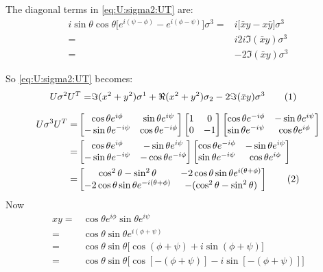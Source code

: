\documentclass[]{article}
\newcommand\numberthis{\addtocounter{equation}{1}\tag{\theequation}}
\begin{document}
The diagonal terms in \eqref{eq:U:sigma2:UT} are:
\begin{align*}
	i \sin{\theta}\cos{\theta}\big[e^{i(\psi-\phi)}-e^{i(\phi-\psi)}\big] \sigma^3 =& i \big[\bar{x}y-x\bar{y}\big] \sigma^3\\
	=&i 2 i  \Im({\bar{x}y}) \sigma^3\\
	=& - 2 \Im({\bar{x}y}) \sigma^3
\end{align*}

So \eqref{eq:U:sigma2:UT} becomes:
\begin{align*}
	U \sigma^2 U^T  =& \Im(x^2 + y^2) \sigma^1 + \Re(x^2+y^2) \sigma_2 - 2 \Im({\bar{x}y}) \sigma^3  \numberthis \label{eq:U:sigma2:expanded}
\end{align*}

\begin{align*}
	U \sigma^3 U^T =&  \begin{bmatrix}
		\cos{\theta} e^{i\phi}&\sin{\theta}e^{i\psi}\\
		-\sin{\theta}e^{-i\psi}&\cos{\theta} e^{-i\phi}
	\end{bmatrix} \begin{bmatrix}
		1&0\\
		0&-1
	\end{bmatrix} \begin{bmatrix}
		\cos{\theta} e^{-i\phi}&-\sin{\theta}e^{i\psi}\\
		\sin{\theta}e^{-i\psi}&\cos{\theta} e^{i\phi}
	\end{bmatrix}\\
	=& \begin{bmatrix}
		\cos{\theta} e^{i\phi}&-\sin{\theta}e^{i\psi}\\
		-\sin{\theta}e^{-i\psi}&-\cos{\theta} e^{-i\phi}
	\end{bmatrix}  \begin{bmatrix}
		\cos{\theta} e^{-i\phi}&-\sin{\theta}e^{i\psi}\\
		\sin{\theta}e^{-i\psi}&\cos{\theta} e^{i\phi}
	\end{bmatrix}\\
	=& \begin{bmatrix}
		\cos^2{\theta}-\sin^2{\theta}&-2 \cos{\theta}\sin{\theta}e^{i(\theta+\phi)}\\
		-2 \cos{\theta}\sin{\theta}e^{-i(\theta+\phi)}&-(\cos^2{\theta}-\sin^2{\theta})
	\end{bmatrix} \numberthis \label{eq:U:sigma3:UT}
\end{align*}
Now
\begin{align*}
	xy =& \cos{\theta} e^{i\phi} \sin{\theta} e^{i\psi}\\
	=& \cos{\theta} \sin{\theta}  e^{i(\phi + \psi)}\\
	=& \cos{\theta} \sin{\theta}  \big[\cos{(\phi + \psi)}+ i \sin{(\phi + \psi)}\big]\\
	=& \cos{\theta} \sin{\theta}  \big[\cos{[-(\phi + \psi)]}- i \sin{[-(\phi + \psi)]}\big]
\end{align*}
\end{document}
